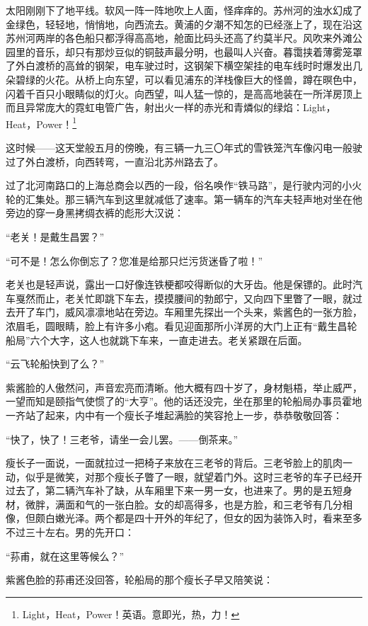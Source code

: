 \par 太阳刚刚下了地平线。软风一阵一阵地吹上人面，怪痒痒的。苏州河的浊水幻成了金绿色，轻轻地，悄悄地，向西流去。黄浦的夕潮不知怎的已经涨上了，现在沿这苏州河两岸的各色船只都浮得高高地，舱面比码头还高了约莫半尺。风吹来外滩公园里的音乐，却只有那炒豆似的铜鼓声最分明，也最叫人兴奋。暮霭挟着薄雾笼罩了外白渡桥的高耸的钢架，电车驶过时，这钢架下横空架挂的电车线时时爆发出几朵碧绿的火花。从桥上向东望，可以看见浦东的洋栈像巨大的怪兽，蹲在暝色中，闪着千百只小眼睛似的灯火。向西望，叫人猛一惊的，是高高地装在一所洋房顶上而且异常庞大的霓虹电管广告，射出火一样的赤光和青燐似的绿焰：Light，Heat，Power！\footnote{Light，Heat，Power！英语。意即光，热，力！}
\par 这时候——这天堂般五月的傍晚，有三辆一九三〇年式的雪铁笼汽车像闪电一般驶过了外白渡桥，向西转弯，一直沿北苏州路去了。
\par 过了北河南路口的上海总商会以西的一段，俗名唤作“铁马路”，是行驶内河的小火轮的汇集处。那三辆汽车到这里就减低了速率。第一辆车的汽车夫轻声地对坐在他旁边的穿一身黑拷绸衣裤的彪形大汉说：
\par “老关！是戴生昌罢？”
\par “可不是！怎么你倒忘了？您准是给那只烂污货迷昏了啦！”
\par 老关也是轻声说，露出一口好像连铁梗都咬得断似的大牙齿。他是保镖的。此时汽车戛然而止，老关忙即跳下车去，摸摸腰间的勃郎宁，又向四下里瞥了一眼，就过去开了车门，威风凛凛地站在旁边。车厢里先探出一个头来，紫酱色的一张方脸，浓眉毛，圆眼睛，脸上有许多小疱。看见迎面那所小洋房的大门上正有“戴生昌轮船局”六个大字，这人也就跳下车来，一直走进去。老关紧跟在后面。
\par “云飞轮船快到了么？”
\par 紫酱脸的人傲然问，声音宏亮而清晰。他大概有四十岁了，身材魁梧，举止威严，一望而知是颐指气使惯了的“大亨”。他的话还没完，坐在那里的轮船局办事员霍地一齐站了起来，内中有一个瘦长子堆起满脸的笑容抢上一步，恭恭敬敬回答：
\par “快了，快了！三老爷，请坐一会儿罢。——倒茶来。”
\par 瘦长子一面说，一面就拉过一把椅子来放在三老爷的背后。三老爷脸上的肌肉一动，似乎是微笑，对那个瘦长子瞥了一眼，就望着门外。这时三老爷的车子已经开过去了，第二辆汽车补了缺，从车厢里下来一男一女，也进来了。男的是五短身材，微胖，满面和气的一张白脸。女的却高得多，也是方脸，和三老爷有几分相像，但颇白嫩光泽。两个都是四十开外的年纪了，但女的因为装饰入时，看来至多不过三十左右。男的先开口：
\par “荪甫，就在这里等候么？”
\par 紫酱色脸的荪甫还没回答，轮船局的那个瘦长子早又陪笑说：
